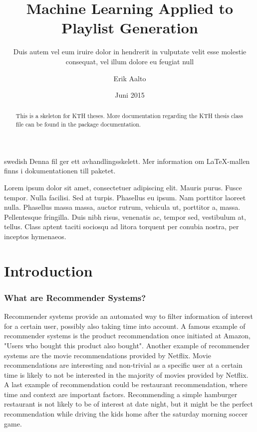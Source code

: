 \documentclass[a4paper,11pt]{kth-mag}
\title{Machine Learning Applied to Playlist Generation}
\subtitle{Duis autem vel eum iruire dolor in hendrerit in
          vulputate velit esse molestie consequat, vel illum
          dolore eu feugiat null}
\author{Erik Aalto}
\date{Juni 2015}
\begin{document}
\frontmatter
\pagestyle{empty}
\removepagenumbers
\maketitle
{}
\begin{abstract}
  This is a skeleton for KTH theses. More documentation
  regarding the KTH thesis class file can be found in
  the package documentation.


\end{abstract}
\clearpage
\begin{foreignabstract}{swedish}
  Denna fil ger ett avhandlingsskelett.
  Mer information om \LaTeX-mallen finns i
  dokumentationen till paketet.

Lorem ipsum dolor sit amet, consectetuer adipiscing elit. Mauris
purus. Fusce tempor. Nulla facilisi. Sed at turpis. Phasellus eu
ipsum. Nam porttitor laoreet nulla. Phasellus massa massa, auctor
rutrum, vehicula ut, porttitor a, massa. Pellentesque fringilla. Duis
nibh risus, venenatis ac, tempor sed, vestibulum at, tellus. Class
aptent taciti sociosqu ad litora torquent per conubia nostra, per
inceptos hymenaeos.
\end{foreignabstract}
\clearpage
\tableofcontents*
\mainmatter
\pagestyle{newchap}
\chapter{Introduction}

\subsection{What are Recommender Systems?}
Recommender systems provide an automated way to filter information of interest for a certain user, possibly also taking time into account. A famous example of recommender systems is the product recommendation once initiated at Amazon, "Users who bought this product also bought". Another example of recommender systems are the movie recommendations provided by Netflix. Movie recommendations are interesting and non-trivial as a specific user at a certain time is likely to not be interested in the majority of movies provided by Netflix. A last example of recommendation could be restaurant recommendation, where time and context are important factors. Recommending a simple hamburger restaurant is not likely to be of interest at date night, but it might be the perfect recommendation while driving the kids home after the saturday morning soccer game.
\end{document}
